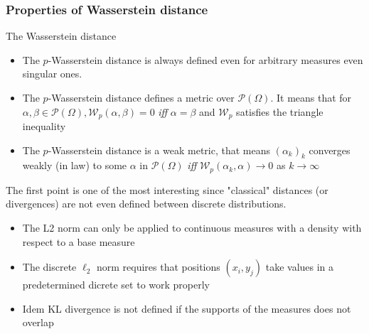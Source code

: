\documentclass[french,9pt]{beamer}
\begin{document}
\begin{frame}
  \frametitle{Properties of Wasserstein distance}
  
  \begin{block}{The Wasserstein distance}
  \begin{itemize}
  \item The $p$-Wasserstein distance is always defined even for arbitrary measures even singular ones.
  \item The $p$-Wasserstein distance defines a metric over $\mathcal{P}(\Omega)$. It means that for $\alpha, \beta \in \mathcal{P}(\Omega), \mathcal{W}_{p}(\alpha,\beta)=0$ \textit{iff} $\alpha=\beta$ and $ \mathcal{W}_{p}$ satisfies the triangle inequality
  \item The $p$-Wasserstein distance is a weak metric, that means $(\alpha_{k})_{k}$ converges weakly (in law) to some $\alpha$ in $\mathcal{P}(\Omega)$ \textit{iff} $ \mathcal{W}_{p}(\alpha_{k},\alpha) \rightarrow 0$ as $k \rightarrow \infty$
  \end{itemize}
  \end{block}
  
  The first point is one of the most interesting since "classical" distances (or divergences) are not even defined between discrete distributions. 
  
  \begin{itemize}
  \item The L2 norm can only be applied to continuous measures with a density with respect to a base measure
  \item The discrete $\ell_{2}$ norm requires that positions $(x_{i}, y_{j})$ take values in a predetermined dicrete set to work properly 
  \item Idem KL divergence is not defined if the supports of the measures does not overlap
  \end{itemize}


\end{frame}

\end{document}

